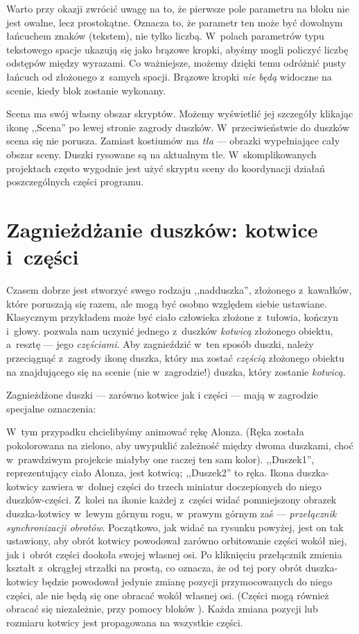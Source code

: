 \documentclass{report}
\begin{document}
Warto przy okazji zwrócić uwagę na to, że pierwsze pole parametru na bloku  nie jest owalne, lecz prostokątne. Oznacza to, że parametr ten może być dowolnym łańcuchem znaków (tekstem), nie tylko liczbą. W~polach parametrów typu tekstowego spacje ukazują się jako brązowe kropki, abyśmy mogli policzyć liczbę odstępów między wyrazami. Co ważniejsze, możemy dzięki temu odróżnić pusty łańcuch od złożonego z~samych spacji. Brązowe kropki \emph{nie będą} widoczne na scenie, kiedy blok zostanie wykonany.

Scena ma swój własny obszar skryptów. Możemy wyświetlić jej szczegóły klikając ikonę ,,Scena'' po lewej stronie zagrody duszków. W~przeciwieństwie do duszków scena się nie porusza. Zamiast kostiumów ma \emph{tła} --- obrazki wypełniające cały obszar sceny. Duszki rysowane są na aktualnym tle. W~skomplikowanych projektach często wygodnie jest użyć skryptu sceny do koordynacji działań poszczególnych części programu.

\section{Zagnieżdżanie duszków: kotwice i~części}
\label{sec:zagnieżdżanie-duszków}

Czasem dobrze jest stworzyć swego rodzaju ,,nadduszka'', złożonego z~kawałków, które poruszają się razem, ale mogą być osobno względem siebie ustawiane. Klasycznym przykładem może być ciało człowieka złożone z~tułowia, kończyn i~głowy. \Snap{} pozwala nam uczynić jednego z~duszków \emph{kotwicą} złożonego obiektu, a~resztę --- jego \emph{częściami}. Aby zagnieździć w~ten sposób duszki, należy przeciągnąć z~zagrody ikonę duszka, który ma zostać \emph{częścią} złożonego obiektu na znajdującego się na scenie (nie w~zagrodzie!) duszka, który zostanie \emph{kotwicą}.

Zagnieżdżone duszki --- zarówno kotwice jak i części --- mają w zagrodzie specjalne oznaczenia:


W~tym przypadku chcielibyśmy animować rękę Alonza. (Ręka została pokolorowana na zielono, aby uwypuklić zależność między dwoma duszkami, choć w~prawdziwym projekcie miałyby one raczej ten sam kolor). ,,Duszek1'', reprezentujący ciało Alonza, jest kotwicą; ,,Duszek2'' to ręka. Ikona duszka-kotwicy zawiera w~dolnej części do trzech miniatur doczepionych do niego duszków-części. Z~kolei na ikonie każdej z~części widać pomniejszony obrazek duszka-kotwicy w~lewym górnym rogu, w~prawym górnym zaś --- \emph{przełącznik synchronizacji obrotów}. Początkowo, jak widać na rysunku powyżej, jest on tak ustawiony, aby obrót kotwicy powodował zarówno orbitowanie części wokół niej, jak i~obrót części dookoła swojej własnej osi. Po kliknięciu przełącznik zmienia kształt z~okrągłej strzałki na prostą, co oznacza, że od tej pory obrót duszka-kotwicy będzie powodował jedynie zmianę pozycji przymocowanych do niego części, ale nie będą się one obracać wokół własnej osi. (Części mogą również obracać się niezależnie, przy pomocy bloków ). Każda zmiana pozycji lub rozmiaru kotwicy jest propagowana na wszystkie części.
\end{document}
